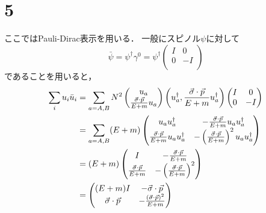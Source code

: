 \section*{5}
ここではPauli-Dirac表示を用いる．
一般にスピノル$\psi$に対して
\begin{equation}
  \bar{\psi} = \psi^{\dagger}\gamma^0 = \psi^{\dagger}
  \begin{pmatrix}
    I & 0 \\
    0 & -I \\
  \end{pmatrix}
\end{equation}
であることを用いると，
\begin{align}
  \sum_i u_i \bar{u}_i 
  &= \sum_{a=A,B} N^2 
  \begin{pmatrix}
    u_a \\ \frac{\vec{\sigma}\cdot \vec{p}}{E+m} u_a \\
  \end{pmatrix}
  \left(u_a^{\dagger}, \frac{\vec{\sigma}\cdot \vec{p}}{E+m} u_a^{\dagger} \right) 
  \begin{pmatrix}
    I & 0 \\
    0 & -I \\
  \end{pmatrix}
  \notag\\
  &= \sum_{a=A,B} (E+m) 
  \begin{pmatrix}
    u_a u_a^{\dagger} & - \frac{\vec{\sigma}\cdot \vec{p}}{E+m}u_a u_a^{\dagger} \\
    \frac{\vec{\sigma}\cdot \vec{p}}{E+m}u_a u_a^{\dagger} & - \left(\frac{\vec{\sigma}\cdot \vec{p}}{E+m}\right)^2 u_a u_a^{\dagger} \\
  \end{pmatrix}
  \notag\\
  &= (E+m) 
  \begin{pmatrix}
    I & - \frac{\vec{\sigma}\cdot \vec{p}}{E+m} \\
    \frac{\vec{\sigma}\cdot \vec{p}}{E+m} & - \left(\frac{\vec{\sigma}\cdot \vec{p}}{E+m}\right)^2 \\
  \end{pmatrix}
  \notag\\
  &= 
  \begin{pmatrix}
    (E+m)I & - \vec{\sigma}\cdot \vec{p} \\
    \vec{\sigma}\cdot \vec{p} & - \frac{\left(\vec{\sigma}\cdot \vec{p}\right)^2}{E+m} \\
  \end{pmatrix}
\end{align}
